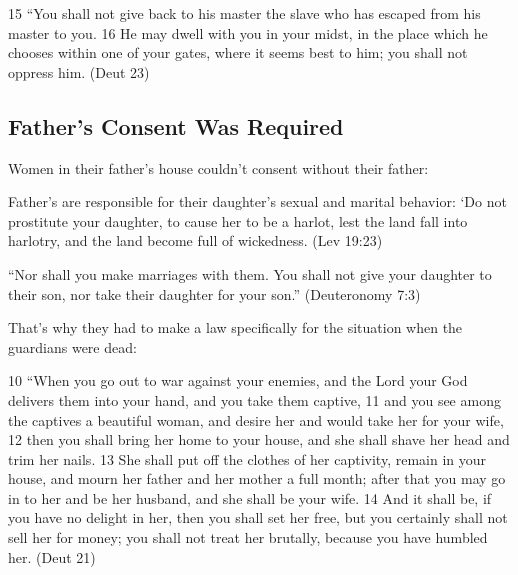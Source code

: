 \documentclass[11pt]{article}
\begin{document}
{15 “You shall not give back to his master the slave who has escaped from his master to you. 16 He may dwell with you in your midst, in the place which he chooses within one of your gates, where it seems best to him; you shall not oppress him. (Deut 23)



\subsection{Father's Consent Was Required}

Women in their father’s house couldn’t consent without their father: 
 

Father’s are responsible for their daughter’s sexual and marital behavior:
‘Do not prostitute your daughter, to cause her to be a harlot, lest the land fall into harlotry, and the land become full of wickedness. (Lev 19:23)


“Nor shall you make marriages with them. You shall not give your daughter to their son, nor take their daughter for your son.”
(Deuteronomy 7:3)


That’s why they had to make a law specifically for the situation when the guardians were dead:


10 “When you go out to war against your enemies, and the Lord your God delivers them into your hand, and you take them captive, 11 and you see among the captives a beautiful woman, and desire her and would take her for your wife, 12 then you shall bring her home to your house, and she shall shave her head and trim her nails. 13 She shall put off the clothes of her captivity, remain in your house, and mourn her father and her mother a full month; after that you may go in to her and be her husband, and she shall be your wife. 14 And it shall be, if you have no delight in her, then you shall set her free, but you certainly shall not sell her for money; you shall not treat her brutally, because you have humbled her. (Deut 21)



}
\end{document}
